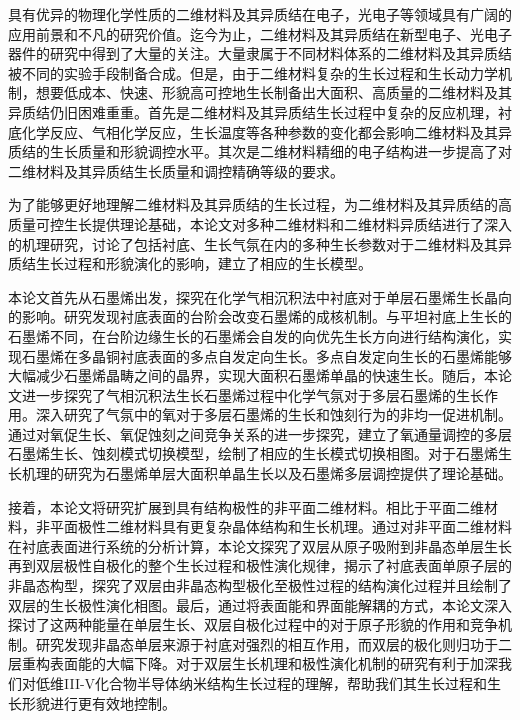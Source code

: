 \begin{chineseabstract}
    具有优异的物理化学性质的二维材料及其异质结在电子，光电子等领域具有广阔的应用前景和不凡的研究价值。迄今为止，二维材料及其异质结在新型电子、光电子器件的研究中得到了大量的关注。大量隶属于不同材料体系的二维材料及其异质结被不同的实验手段制备合成。但是，由于二维材料复杂的生长过程和生长动力学机制，想要低成本、快速、形貌高可控地生长制备出大面积、高质量的二维材料及其异质结仍旧困难重重。首先是二维材料及其异质结生长过程中复杂的反应机理，衬底化学反应、气相化学反应，生长温度等各种参数的变化都会影响二维材料及其异质结的生长质量和形貌调控水平。其次是二维材料精细的电子结构进一步提高了对二维材料及其异质结生长质量和调控精确等级的要求。
    
    为了能够更好地理解二维材料及其异质结的生长过程，为二维材料及其异质结的高质量可控生长提供理论基础，本论文对多种二维材料和二维材料异质结进行了深入的机理研究，讨论了包括衬底、生长气氛在内的多种生长参数对于二维材料及其异质结生长过程和形貌演化的影响，建立了相应的生长模型。

    本论文首先从石墨烯出发，探究在化学气相沉积法中衬底对于单层石墨烯生长晶向的影响。研究发现衬底表面的台阶会改变石墨烯的成核机制。与平坦衬底上生长的石墨烯不同，在台阶边缘生长的石墨烯会自发的向优先生长方向进行结构演化，实现石墨烯在多晶铜衬底表面的多点自发定向生长。多点自发定向生长的石墨烯能够大幅减少石墨烯晶畴之间的晶界，实现大面积石墨烯单晶的快速生长。随后，本论文进一步探究了气相沉积法生长石墨烯过程中化学气氛对于多层石墨烯的生长作用。深入研究了气氛中的氧对于多层石墨烯的生长和蚀刻行为的非均一促进机制。通过对氧促生长、氧促蚀刻之间竞争关系的进一步探究，建立了氧通量调控的多层石墨烯生长、蚀刻模式切换模型，绘制了相应的生长模式切换相图。对于石墨烯生长机理的研究为石墨烯单层大面积单晶生长以及石墨烯多层调控提供了理论基础。

    接着，本论文将研究扩展到具有结构极性的非平面二维材料。相比于平面二维材料，非平面极性二维材料具有更复杂晶体结构和生长机理。通过对非平面二维材料在衬底表面进行系统的分析计算，本论文探究了双层从原子吸附到非晶态单层生长再到双层极性自极化的整个生长过程和极性演化规律，揭示了衬底表面单原子层的非晶态构型，探究了双层由非晶态构型极化至极性过程的结构演化过程并且绘制了双层的生长极性演化相图。最后，通过将表面能和界面能解耦的方式，本论文深入探讨了这两种能量在单层生长、双层自极化过程中的对于原子形貌的作用和竞争机制。研究发现非晶态单层来源于衬底对强烈的相互作用，而双层的极化则归功于二层重构表面能的大幅下降。对于双层生长机理和极性演化机制的研究有利于加深我们对低维III-V化合物半导体纳米结构生长过程的理解，帮助我们其生长过程和生长形貌进行更有效地控制。


\end{chineseabstract}
